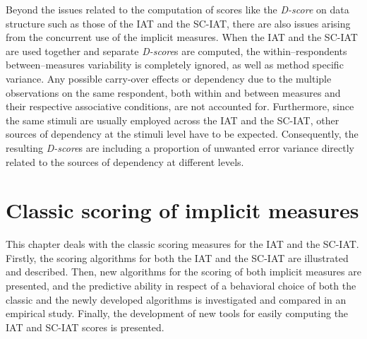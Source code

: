 \documentclass[12pt]{book}
\begin{document}
Beyond the issues related to the computation of scores like the \emph{D-score} on data structure such as those of the IAT and the SC-IAT, there are also issues arising from the concurrent use of the implicit measures. When the IAT and the SC-IAT are used together and separate \emph{D-score}s are computed, the within--respondents between--measures variability is completely ignored, as well as method specific variance. Any possible carry-over effects or dependency due to the multiple observations on the same respondent, both within and between measures and their respective associative conditions, are not accounted for. Furthermore, since the same stimuli are usually employed across the IAT and the SC-IAT, other sources of dependency at the stimuli level have to be expected. Consequently, the resulting \emph{D-score}s are including a proportion of unwanted error variance directly related to the sources of dependency at different levels.   

\chapter{Classic scoring of implicit measures}\label{classicscore}
This chapter deals with the classic scoring measures for the IAT and the SC-IAT. Firstly, the scoring algorithms for both the IAT and the SC-IAT are illustrated and described. Then, new algorithms for the scoring of both implicit measures are presented, and the predictive ability in respect of a behavioral choice of both the classic and the newly developed algorithms is investigated and compared in an empirical study. 
Finally, the development of new tools for easily computing the IAT and SC-IAT scores is presented.

\newpage
\end{document}
